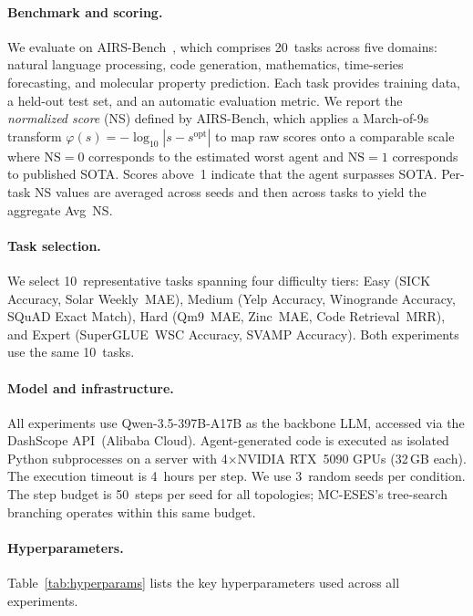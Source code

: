 \documentclass{article} %
\begin{document}
\paragraph{Benchmark and scoring.}
We evaluate on AIRS-Bench~\citep{airsbench2025}, which comprises 20~tasks
across five domains: natural language processing, code generation, mathematics,
time-series forecasting, and molecular property prediction. Each task provides
training data, a held-out test set, and an automatic evaluation metric. We
report the \emph{normalized score} (NS) defined by AIRS-Bench, which applies a
March-of-9s transform $\varphi(s) = -\log_{10}|s - s^{\text{opt}}|$ to map raw
scores onto a comparable scale where $\text{NS} = 0$ corresponds to the
estimated worst agent and $\text{NS} = 1$ corresponds to published SOTA.
Scores above~1 indicate that the agent surpasses SOTA. Per-task NS values are
averaged across seeds and then across tasks to yield the aggregate Avg~NS.

\paragraph{Task selection.}
We select 10~representative tasks spanning four difficulty tiers:
Easy (SICK Accuracy, Solar Weekly~MAE),
Medium (Yelp Accuracy, Winogrande Accuracy, SQuAD Exact Match),
Hard (Qm9~MAE, Zinc~MAE, Code Retrieval~MRR),
and Expert (SuperGLUE~WSC Accuracy, SVAMP Accuracy).
Both experiments use the same 10~tasks.

\paragraph{Model and infrastructure.}
All experiments use Qwen-3.5-397B-A17B as the backbone LLM, accessed via the
DashScope API~(Alibaba Cloud). Agent-generated code is executed as isolated
Python subprocesses on a server with 4$\times$NVIDIA RTX~5090 GPUs
(32\,GB each). The execution timeout is 4~hours per step. We use 3~random seeds
per condition. The step budget is 50~steps per seed for all topologies;
MC-ESES's tree-search branching operates within this same budget.

\paragraph{Hyperparameters.}
Table~\ref{tab:hyperparams} lists the key hyperparameters used across all
experiments.
\end{document}
